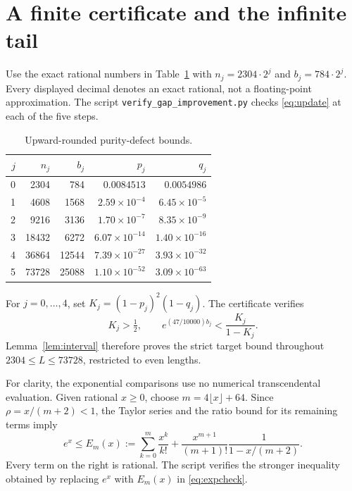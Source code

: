 \documentclass[11pt,a4paper]{article}
\begin{document}
\section{A finite certificate and the infinite tail}
Use the exact rational numbers in Table~\ref{tab:certificate} with
$n_j=2304\cdot2^j$ and $b_j=784\cdot2^j$.
Every displayed decimal denotes an exact rational, not a floating-point
approximation. The script \texttt{verify\_gap\_improvement.py}
checks \eqref{eq:update} at each of the five steps.

\begin{table}[ht]
\centering
\caption{Upward-rounded purity-defect bounds.}\label{tab:certificate}
\begin{tabular}{rrrrr}
\toprule
$j$ & $n_j$ & $b_j$ & $p_j$ & $q_j$\\
\midrule
0 & 2304 & 784 & $0.0084513$ & $0.0054986$\\
1 & 4608 & 1568 & $2.59\times10^{-4}$ & $6.45\times10^{-5}$\\
2 & 9216 & 3136 & $1.70\times10^{-7}$ & $8.35\times10^{-9}$\\
3 & 18432 & 6272 & $6.07\times10^{-14}$ & $1.40\times10^{-16}$\\
4 & 36864 & 12544 & $7.39\times10^{-27}$ & $3.93\times10^{-32}$\\
5 & 73728 & 25088 & $1.10\times10^{-52}$ & $3.09\times10^{-63}$\\
\bottomrule
\end{tabular}
\end{table}

For $j=0,\ldots,4$, set $K_j=(1-p_j)^2(1-q_j)$.
The certificate verifies
\begin{equation}\label{eq:expcheck}
 K_j>\tfrac12,\qquad
 e^{(47/10000)b_j}<\frac{K_j}{1-K_j}.
\end{equation}
Lemma~\ref{lem:interval} therefore proves the strict target bound
throughout $2304\le L\le73728$, restricted to even lengths.

For clarity, the exponential comparisons use no numerical transcendental
evaluation. Given rational $x\ge0$, choose
$m=4\lfloor x\rfloor+64$. Since $\rho=x/(m+2)<1$, the Taylor
series and the ratio bound for its remaining terms imply
\begin{equation}\label{eq:expupper}
 e^x\le E_m(x):=\sum_{k=0}^{m}\frac{x^k}{k!}
 +\frac{x^{m+1}}{(m+1)!}\frac{1}{1-x/(m+2)}.
\end{equation}
Every term on the right is rational. The script verifies the stronger
inequality obtained by replacing $e^x$ with $E_m(x)$ in
\eqref{eq:expcheck}.
\end{document}
